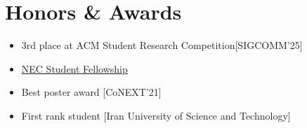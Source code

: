 \section{Honors \& Awards}
\begin{itemize}
	\renewcommand\labelitemi{\ding{118}}
    \item{3rd place at ACM Student Research Competition[SIGCOMM'25]}
    \item{\href{https://neclab.eu/es/careers/nec-student-research-fellowship-program#fellow-1642}{NEC Student Fellowship}}
	\item{Best poster award [CoNEXT'21]}
	\item{First rank student [Iran University of Science and Technology]}
\end{itemize}

